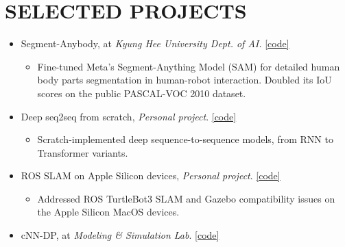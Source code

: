 \documentclass[a4paper,10pt]{extarticle}
\begin{document}
\section*{SELECTED PROJECTS}
\begin{itemize}
	\item Segment-Anybody, at \textit{Kyung Hee University Dept. of AI.} \href{https://github.com/leehyeonbeen/segment-anything-fine-tuning}{[code]}

	      {\footnotesize
		      \vspace*{-0.2cm}
		      \begin{itemize}
			      \item Fine-tuned Meta's Segment-Anything Model (SAM) for detailed human body parts segmentation in human-robot interaction. Doubled its IoU scores on the public PASCAL-VOC 2010 dataset.
		      \end{itemize}
		      \vspace*{-0.2cm}
	      }

	\item Deep seq2seq from scratch, \textit{Personal project}. \href{https://github.com/leehyeonbeen/TimeSeriesSeq2Seq}{[code]}

	      {\footnotesize
		      \vspace*{-0.2cm}
		      \begin{itemize}
			      \item Scratch-implemented deep sequence-to-sequence models, from RNN to Transformer variants.
		      \end{itemize}
		      \vspace*{-0.2cm}
	      }

	\item ROS SLAM on Apple Silicon devices, \textit{Personal project}. \href{https://github.com/leehyeonbeen/ROS-SLAM-AppleSilicon}{[code]}

	      {\footnotesize
		      \vspace*{-0.2cm}
		      \begin{itemize}
			      \item Addressed ROS TurtleBot3 SLAM and Gazebo compatibility issues on the Apple Silicon MacOS devices.
		      \end{itemize}
		      \vspace*{-0.2cm}
	      }



	\item cNN-DP, at \textit{Modeling \& Simulation Lab}. \href{https://github.com/leehyeonbeen/cNN-DP}{[code]}


\end{itemize}
\end{document}
